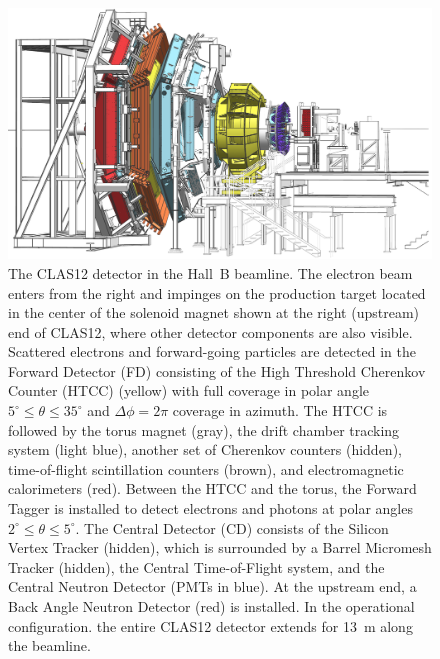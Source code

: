 \documentclass[final,3p]{elsarticle}
\begin{document}
\begin{twocolumn}
\begin{figure}[t]
\centering
\centerline{\includegraphics[width=1.8\columnwidth]{CLAS12-side-3.png}}
\caption{The CLAS12 detector in the Hall~B beamline. The electron beam enters from the right and impinges on
  the production target located in the center of the solenoid magnet shown at the right (upstream) end of CLAS12,
  where other detector components are also visible. Scattered electrons and forward-going particles are detected
  in the Forward Detector (FD) consisting of the High Threshold Cherenkov Counter (HTCC) (yellow) with full coverage
  in polar angle $5^\circ \le \theta \le 35^\circ$ and $\Delta \phi = 2\pi$ coverage in azimuth. The HTCC is followed
  by the torus magnet (gray), the drift chamber tracking system (light blue), another set of Cherenkov counters (hidden),
  time-of-flight scintillation counters (brown), and electromagnetic calorimeters (red). Between the HTCC and the
  torus, the Forward Tagger is installed to detect electrons and photons at polar angles $2^\circ \le \theta \le 5^\circ$.
  The Central Detector (CD) consists of the Silicon Vertex Tracker (hidden), which is surrounded by a Barrel Micromesh
  Tracker (hidden), the Central Time-of-Flight system, and the Central Neutron Detector (PMTs in blue). At the upstream
  end, a Back Angle Neutron Detector (red) is installed. In the operational configuration. the entire CLAS12 detector
  extends for 13~m along the beamline.} 
\label{clas12}
\end{figure}


\end{twocolumn}
\end{document}
